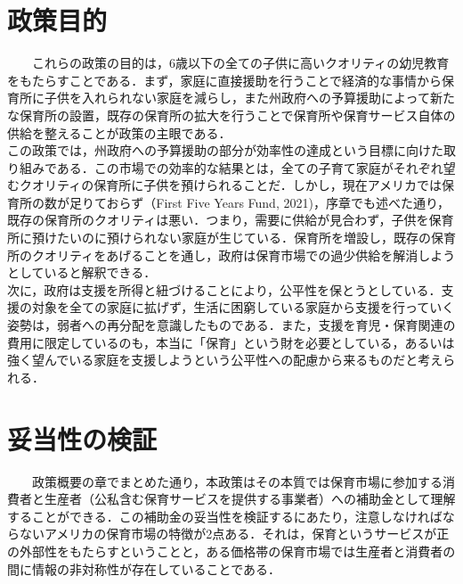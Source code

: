 \documentclass[
]{ltjarticle}
\begin{document}
\hypertarget{ux653fux7b56ux76eeux7684}{%
\section{政策目的}\label{ux653fux7b56ux76eeux7684}}

~~~~これらの政策の目的は，6歳以下の全ての子供に高いクオリティの幼児教育をもたらすことである．まず，家庭に直接援助を行うことで経済的な事情から保育所に子供を入れられない家庭を減らし，また州政府への予算援助によって新たな保育所の設置，既存の保育所の拡大を行うことで保育所や保育サービス自体の供給を整えることが政策の主眼である．\\
\hspace*{0.333em}\hspace*{0.333em}\hspace*{0.333em}\hspace*{0.333em}この政策では，州政府への予算援助の部分が効率性の達成という目標に向けた取り組みである．この市場での効率的な結果とは，全ての子育て家庭がそれぞれ望むクオリティの保育所に子供を預けられることだ．しかし，現在アメリカでは保育所の数が足りておらず（First
Five Years Fund,
2021)，序章でも述べた通り，既存の保育所のクオリティは悪い．つまり，需要に供給が見合わず，子供を保育所に預けたいのに預けられない家庭が生じている．保育所を増設し，既存の保育所のクオリティをあげることを通し，政府は保育市場での過少供給を解消しようとしていると解釈できる．\\
\hspace*{0.333em}\hspace*{0.333em}\hspace*{0.333em}\hspace*{0.333em}次に，政府は支援を所得と紐づけることにより，公平性を保とうとしている．支援の対象を全ての家庭に拡げず，生活に困窮している家庭から支援を行っていく姿勢は，弱者への再分配を意識したものである．また，支援を育児・保育関連の費用に限定しているのも，本当に「保育」という財を必要としている，あるいは強く望んでいる家庭を支援しようという公平性への配慮から来るものだと考えられる．

\hypertarget{ux59a5ux5f53ux6027ux306eux691cux8a3c}{%
\section{妥当性の検証}\label{ux59a5ux5f53ux6027ux306eux691cux8a3c}}

~~~~政策概要の章でまとめた通り，本政策はその本質では保育市場に参加する消費者と生産者（公私含む保育サービスを提供する事業者）への補助金として理解することができる．この補助金の妥当性を検証するにあたり，注意しなければならないアメリカの保育市場の特徴が2点ある．それは，保育というサービスが正の外部性をもたらすということと，ある価格帯の保育市場では生産者と消費者の間に情報の非対称性が存在していることである．
\end{document}

